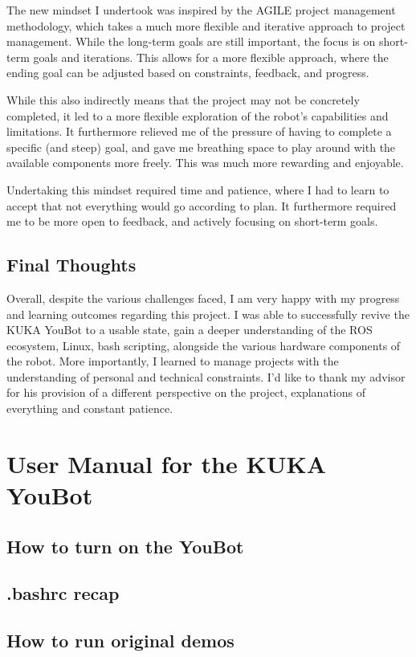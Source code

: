 \documentclass[a4paper, 12pt]{article}
\begin{document}
    The new mindset I undertook was inspired by the AGILE project management methodology, which takes a much more flexible and iterative approach to project management. While the long-term goals are still important, the focus is on short-term goals and iterations. This allows for a more flexible approach, where the ending goal can be adjusted based on constraints, feedback, and progress. 

    While this also indirectly means that the project may not be concretely completed, it led to a more flexible exploration of the robot's capabilities and limitations. It furthermore relieved me of the pressure of having to complete a specific (and steep) goal, and gave me breathing space to play around with the available components more freely. This was much more rewarding and enjoyable.

    Undertaking this mindset required time and patience, where I had to learn to accept that not everything would go according to plan. It furthermore required me to be more open to feedback, and actively focusing on short-term goals. 

    \subsection{Final Thoughts}

    Overall, despite the various challenges faced, I am very happy with my progress and learning outcomes regarding this project. I was able to successfully revive the KUKA YouBot to a usable state, gain a deeper understanding of the ROS ecosystem, Linux, bash scripting, alongside the various hardware components of the robot. More importantly, I learned to manage projects with the understanding of personal and technical constraints. I'd like to thank my advisor for his provision of a different perspective on the project, explanations of everything and constant patience.  


    \newpage

    \nocite{*}
    \printbibliography

    \newpage

    \appendix


    \section{User Manual for the KUKA YouBot}

    \subsection{
     How to turn on the YouBot
    }

    \subsection{.bashrc recap}

    \subsection{How to run original demos}

    
    
\end{document}
